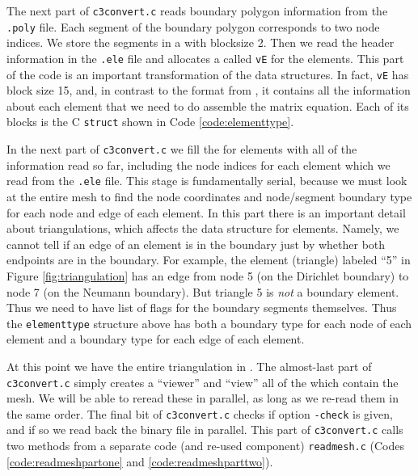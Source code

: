 The next part of \texttt{c3convert.c} reads boundary polygon information from the \texttt{.poly} file.  Each segment of the boundary polygon corresponds to two node indices.  We store the segments in a \pVec with blocksize 2.  Then we read the header information in the \texttt{.ele} file and allocates a \pVec called \texttt{vE} for the elements.  This part of the code is an important transformation of the data structures.  In fact, \texttt{vE} has block size 15, and, in contrast to the format from \Triangle, it contains all the information about each element that we need to do assemble the matrix equation.  Each of its blocks is the C \texttt{struct} shown in Code \ref{code:elementtype}.


In the next part of \texttt{c3convert.c} we fill the \pVec for elements with all of the information read so far, including the node indices for each element which we read from the \texttt{.ele} file.  This stage is fundamentally serial, because we must look at the entire mesh to find the node coordinates and node/segment boundary type for each node and edge of each element.  In this part there is an important detail about triangulations, which affects the data structure for elements.  Namely, we cannot tell if an edge of an element is in the boundary just by whether both endpoints are in the boundary.  For example, the element (triangle) labeled ``5'' in Figure \ref{fig:triangulation} has an edge from node 5 (on the Dirichlet boundary) to node 7 (on the Neumann boundary).  But triangle 5 is \emph{not} a boundary element.  Thus we need to have list of flags for the boundary segments themselves.  Thus the \texttt{elementtype} structure above has both a boundary type for each node of each element and a boundary type for each edge of each element.

At this point we have the entire triangulation in \PETSc \pVecs.  The almost-last part of \texttt{c3convert.c} simply creates a \PETSc ``viewer'' and ``view'' all of the \pVecs which contain the mesh.  We will be able to reread these \pVecs in parallel, as long as we re-read them in the same order.  The final bit of \texttt{c3convert.c} checks if option \texttt{-check} is given, and if so we read back the binary file in parallel.  This part of \texttt{c3convert.c} calls two methods from a separate code (and re-used component) \texttt{readmesh.c} (Codes \ref{code:readmeshpartone} and \ref{code:readmeshparttwo}).

